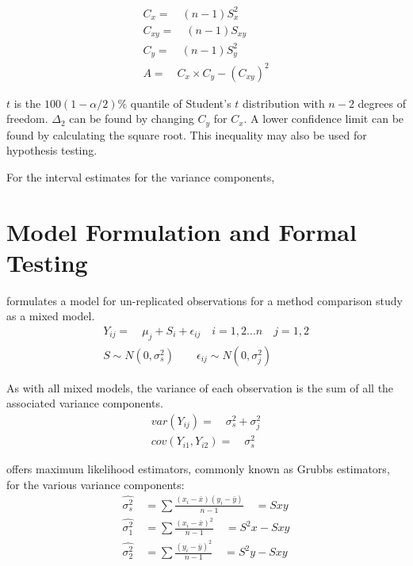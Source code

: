 \documentclass[12pt, a4paper]{report}
\theoremstyle{plain}
\theoremstyle{definition}
\theoremstyle{remark}
\begin{document}
		\begin{eqnarray}
		C_{x}=\quad(n-1)S^2_{x}\nonumber\\
		C_{xy}=\quad(n-1)S_{xy}\nonumber\\
		C_{y}=\quad(n-1)S^2_{y}\nonumber\\
		A=\quad C_{x}\times C_{y} - (C_{xy})^2 \nonumber
		\end{eqnarray}
		
		$t$ is the $100(1-\alpha/2)\%$ quantile of Student's $t$
		distribution with $n-2$ degrees of freedom. $\Delta_{2}$ can be
		found by changing $C_{y}$ for $C_{x}$. A lower confidence limit
		can be found by calculating the square root. This inequality may
		also be used for hypothesis testing.
		
		For the interval estimates for the variance components,
	\section{Model Formulation and Formal Testing}
	
	\citet{Kinsella} formulates a model for un-replicated observations
	for a method comparison study as a mixed model.
	\begin{eqnarray}
	Y_{ij} =\quad \mu_{j} + S_{i} + \epsilon_{ij} \quad i=1,2...n\quad
	j=1,2\\
	S \sim N(0,\sigma^{2}_{s})\qquad \epsilon_{ij} \sim
	N(0,\sigma^{2}_{j}) \nonumber
	\end{eqnarray}
	
	As with all mixed models, the variance of each observation is the
	sum of all the associated variance components.
	\begin{eqnarray}
	var(Y_{ij}) =\quad \sigma^{2}_{s} + \sigma^{2}_{j} \\
	cov(Y_{i1},Y_{i2})=\quad \sigma^{2}_{s} \nonumber
	\end{eqnarray}
	
	\citet{Grubbs48} offers maximum likelihood estimators, commonly
	known as Grubbs estimators, for the various variance components:
	\begin{eqnarray}
	\hat{\sigma^{2}_{s}} \quad= \sum{\frac{(x_{i}-\bar{x})(y_{i}-\bar{y})}{n-1}}\quad=Sxy\\
	\hat{\sigma^{2}_{1}} \quad= \sum{\frac{(x_{i}-\bar{x})^{2}}{n-1}} \quad=S^{2}x-Sxy \nonumber\\
	\hat{\sigma^{2}_{2}} \quad=
	\sum{\frac{(y_{i}-\bar{y})^{2}}{n-1}}\quad=S^{2}y-Sxy \nonumber
	\nonumber
	\end{eqnarray}
	
\end{document}
